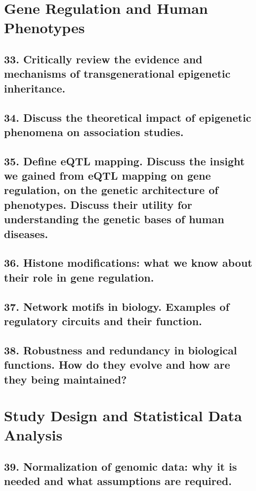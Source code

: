 \documentclass{tufte-handout}
\theoremstyle{noparens}
\begin{document}
\section{Gene Regulation and Human Phenotypes}\label{sec:genreg}
\subsection{33. Critically review the evidence and mechanisms of transgenerational epigenetic inheritance.}

\newpage
\subsection{34. Discuss the theoretical impact of epigenetic phenomena on association studies.}

\newpage
\subsection{35. Define eQTL mapping. Discuss the insight we gained from eQTL mapping on gene regulation, on the genetic architecture of phenotypes. Discuss their utility for understanding the genetic bases of human diseases.}

\newpage
\subsection{36. Histone modifications: what we know about their role in gene regulation.}

\newpage
\subsection{37. Network motifs in biology. Examples of regulatory circuits and their function.}

\newpage
\subsection{38. Robustness and redundancy in biological functions. How do they evolve and how are they being maintained?}

\newpage
\section{Study Design and Statistical Data Analysis}\label{sec:stats}

\subsection{39. Normalization of genomic data: why it is needed and what assumptions are required.}
\end{document}
